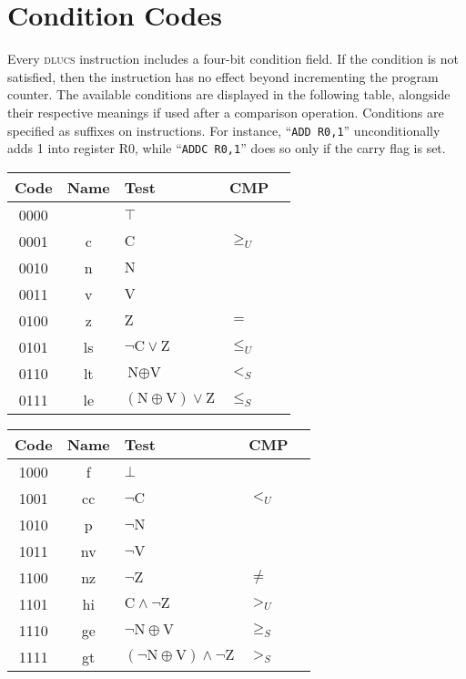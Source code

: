 \documentclass[11pt]{book}
\let\geq\geqslant
\let\leq\leqslant
\begin{document}
\section{Condition Codes}
Every \textsc{dlucs} instruction includes a four-bit condition field.
If the condition is not satisfied, then the instruction has no effect
beyond incrementing the program counter.
The available conditions are displayed in the following table,
alongside their respective meanings
if used after a comparison operation.
Conditions are specified as suffixes on instructions.
For instance, ``\texttt{ADD R0,1}''
unconditionally adds 1 into register R0,
while ``\texttt{ADDC R0,1}'' does so
only if the carry flag is set.

\begin{center}
\begin{tabular}{cclll}
  \toprule
  Code&Name&Test&CMP\\\midrule
  0000&&\(\top\)\\
  0001&c&\(\text{C}\)&\(\geq_U\)\\
  0010&n&\(\text{N}\)\\
  0011&v&\(\text{V}\)\\
  0100&z&\(\text{Z}\)&\(=\)\\
  0101&ls&\(\neg\text{C}\vee\text{Z}\)&\(\leq_U\)\\
  0110&lt&\(\text{N}\oplus\text{V}\)&\(<_S\)\\
  0111&le&\((\text{N}\oplus\text{V})\vee\text{Z}\)
  &\(\leq_S\)\\
  \bottomrule
\end{tabular}\qquad
\begin{tabular}{cclll}
  \toprule
  Code&Name&Test&CMP\\\midrule
  1000&f&\(\bot\)\\
  1001&cc&\(\neg\text{C}\)&\(<_U\)\\
  1010&p&\(\neg\text{N}\)\\
  1011&nv&\(\neg\text{V}\)\\
  1100&nz&\(\neg\text{Z}\)&\(\neq\)\\
  1101&hi&\(\text{C}\wedge\neg\text{Z}\)&\(>_U\)\\
  1110&ge&\(\neg\text{N}\oplus\text{V}\)&\(\geq_S\)\\
  1111&gt&\((\neg\text{N}\oplus\text{V})\wedge\neg\text{Z}\)
  &\(>_S\)\\
  \bottomrule
\end{tabular}
\end{center}
\end{document}
